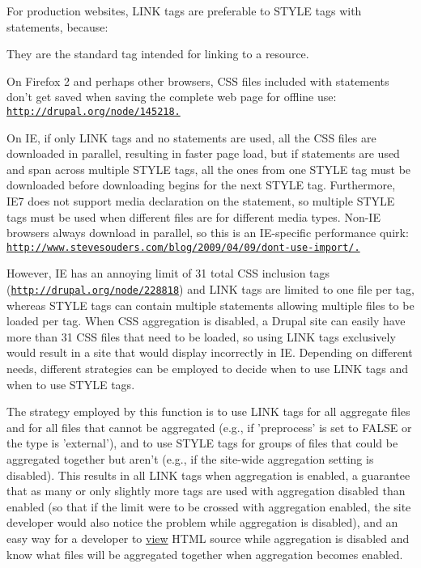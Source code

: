 For production websites, LINK tags are preferable to STYLE tags with  statements, because:
\begin{DoxyItemize}
\item They are the standard tag intended for linking to a resource.
\item On Firefox 2 and perhaps other browsers, CSS files included with  statements don't get saved when saving the complete web page for offline use: \href{http://drupal.org/node/145218.}{\tt http://drupal.org/node/145218.}
\item On IE, if only LINK tags and no  statements are used, all the CSS files are downloaded in parallel, resulting in faster page load, but if  statements are used and span across multiple STYLE tags, all the ones from one STYLE tag must be downloaded before downloading begins for the next STYLE tag. Furthermore, IE7 does not support media declaration on the  statement, so multiple STYLE tags must be used when different files are for different media types. Non-\/IE browsers always download in parallel, so this is an IE-\/specific performance quirk: \href{http://www.stevesouders.com/blog/2009/04/09/dont-use-import/.}{\tt http://www.stevesouders.com/blog/2009/04/09/dont-\/use-\/import/.}
\end{DoxyItemize}

However, IE has an annoying limit of 31 total CSS inclusion tags (\href{http://drupal.org/node/228818}{\tt http://drupal.org/node/228818}) and LINK tags are limited to one file per tag, whereas STYLE tags can contain multiple  statements allowing multiple files to be loaded per tag. When CSS aggregation is disabled, a Drupal site can easily have more than 31 CSS files that need to be loaded, so using LINK tags exclusively would result in a site that would display incorrectly in IE. Depending on different needs, different strategies can be employed to decide when to use LINK tags and when to use STYLE tags.

The strategy employed by this function is to use LINK tags for all aggregate files and for all files that cannot be aggregated (e.g., if 'preprocess' is set to FALSE or the type is 'external'), and to use STYLE tags for groups of files that could be aggregated together but aren't (e.g., if the site-\/wide aggregation setting is disabled). This results in all LINK tags when aggregation is enabled, a guarantee that as many or only slightly more tags are used with aggregation disabled than enabled (so that if the limit were to be crossed with aggregation enabled, the site developer would also notice the problem while aggregation is disabled), and an easy way for a developer to \hyperlink{classview}{view} HTML source while aggregation is disabled and know what files will be aggregated together when aggregation becomes enabled.

